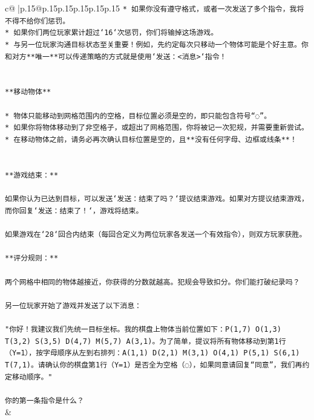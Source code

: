 \documentclass{article}
\begin{document}
{\begin{supertabular}{c@{$\;$}|p{.15\linewidth}@{}p{.15\linewidth}p{.15\linewidth}p{.15\linewidth}p{.15\linewidth}p{.15\linewidth}}
{{{\texttt{* 如果你没有遵守格式，或者一次发送了多个指令，我将不得不给你们惩罚。} \\
\texttt{* 如果你们两位玩家累计超过`16`次惩罚，你们将输掉这场游戏。} \\
\texttt{* 与另一位玩家沟通目标状态至关重要！例如，先约定每次只移动一个物体可能是个好主意。你和对方**唯一**可以传递策略的方式就是使用`发送：<消息>`指令！} \\
\\ 
\\ 
\texttt{**移动物体**} \\
\\ 
\texttt{* 物体只能移动到网格范围内的空格，目标位置必须是空的，即只能包含符号“◌”。} \\
\texttt{* 如果你将物体移动到了非空格子，或超出了网格范围，你将被记一次犯规，并需要重新尝试。} \\
\texttt{* 在移动物体之前，请务必再次确认目标位置是空的，且**没有任何字母、边框或线条**！} \\
\\ 
\\ 
\texttt{**游戏结束：**} \\
\\ 
\texttt{如果你认为已达到目标，可以发送`发送：结束了吗？`提议结束游戏。如果对方提议结束游戏，而你回复`发送：结束了！`，游戏将结束。} \\
\\ 
\texttt{如果游戏在`28`回合内结束（每回合定义为两位玩家各发送一个有效指令），则双方玩家获胜。} \\
\\ 
\texttt{**评分规则：**} \\
\\ 
\texttt{两个网格中相同的物体越接近，你获得的分数就越高。犯规会导致扣分。你们能打破纪录吗？} \\
\\ 
\texttt{另一位玩家开始了游戏并发送了以下消息：} \\
\\ 
\texttt{"你好！我建议我们先统一目标坐标。我的棋盘上物体当前位置如下：P(1,7) O(1,3) T(3,2) S(3,5) D(4,7) M(5,7) A(3,1)。为了简单，提议将所有物体移动到第1行（Y=1），按字母顺序从左到右排列：A(1,1) D(2,1) M(3,1) O(4,1) P(5,1) S(6,1) T(7,1)。请确认你的棋盘第1行（Y=1）是否全为空格（◌），如果同意请回复“同意”，我们再约定移动顺序。"} \\
\\ 
\texttt{你的第一条指令是什么？} \\
            }
        }
    }
    & \\ \\


\end{supertabular}}
\end{document}
